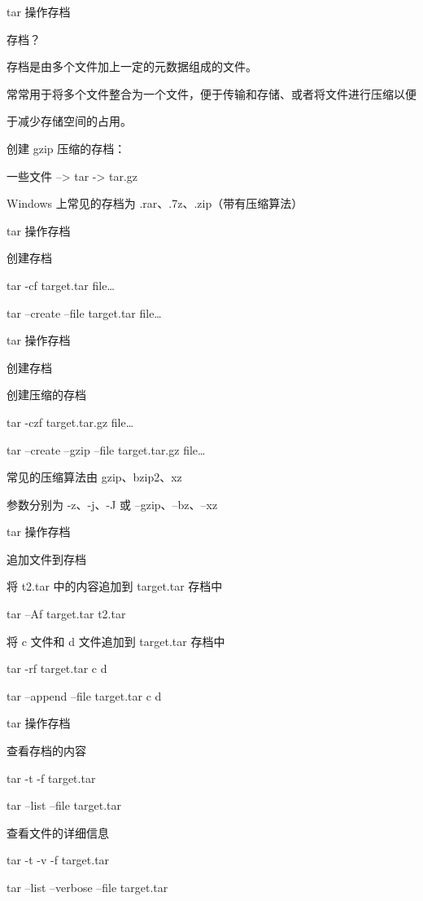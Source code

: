 \documentclass[UTF8]{ctexbeamer}
\begin{document}
\begin{frame}{tar 操作存档}

    存档？

    存档是由多个文件加上一定的元数据组成的文件。

    常常用于将多个文件整合为一个文件，便于传输和存储、或者将文件进行压缩以便

    于减少存储空间的占用。

    创建 gzip 压缩的存档：

    一些文件 –> tar -> tar.gz

    Windows 上常见的存档为 .rar、.7z、.zip（带有压缩算法）
    
\end{frame}
\begin{frame}{tar 操作存档}

    创建存档

    tar -cf target.tar file…

    tar --create --file target.tar file…
    
\end{frame}
\begin{frame}{tar 操作存档}

    创建存档

    创建压缩的存档

    tar -czf target.tar.gz file…

    tar --create --gzip –file target.tar.gz file…

    常见的压缩算法由 gzip、bzip2、xz

    参数分别为 -z、-j、-J 或 --gzip、--bz、--xz
    
\end{frame}
\begin{frame}{tar 操作存档}

    追加文件到存档

    将 t2.tar 中的内容追加到 target.tar 存档中

    tar –Af target.tar t2.tar

    将 c 文件和 d 文件追加到 target.tar 存档中

    tar -rf target.tar c d

    tar --append --file target.tar c d
    
\end{frame}
\begin{frame}{tar 操作存档}

    查看存档的内容

    tar -t -f target.tar

    tar --list --file target.tar

    查看文件的详细信息

    tar -t -v -f target.tar

    tar --list --verbose --file target.tar
    
\end{frame}
\end{document}
